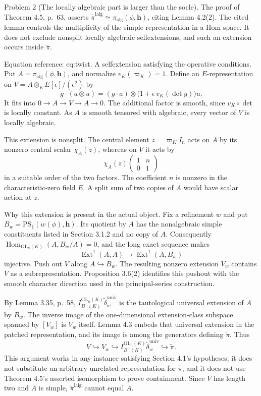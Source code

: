 \documentclass[10pt]{article}
\begin{document}
Problem 2 (The locally algebraic part is larger than the socle).  The proof of Theorem 4.5, p. 63, asserts \(\widetilde\pi^{\mathrm{lalg}}\simeq\pi_{\mathrm{alg}}(\phi,\mathbf h)\), citing Lemma 4.2(2). The cited lemma controls the multiplicity of the simple representation in a Hom space. It does not exclude nonsplit locally algebraic selfextensions, and such an extension occurs inside \(\widetilde\pi\).\par
Equation reference: eq:twist. A selfextension satisfying the operative conditions. Put \(A=\pi_{\mathrm{alg}}(\phi,\mathbf h)\), and normalize \(v_K(\varpi_K)=1\). Define an \(E\)-representation on \(V=A\otimes_E E[\epsilon]/(\epsilon^2)\) by \[
 g\cdot(a\otimes u)
   =(g\cdot a)\otimes
     \bigl(1+\epsilon\,v_K(\det g)\bigr)u .\] It fits into \(0\to A\to V\to A\to0\). The additional factor is smooth, since \(v_K\circ\det\) is locally constant. As \(A\) is smooth tensored with algebraic, every vector of \(V\) is locally algebraic.\par
This extension is nonsplit. The central element \(z=\varpi_K I_n\) acts on \(A\) by its nonzero central scalar \(\chi_A(z)\), whereas on \(V\) it acts by \[\chi_A(z)
 \begin{pmatrix}1&n\\0&1\end{pmatrix}\] in a suitable order of the two factors. The coefficient \(n\) is nonzero in the characteristic-zero field \(E\). A split sum of two copies of \(A\) would have scalar action at \(z\).\par
Why this extension is present in the actual object. Fix a refinement \(w\) and put \(B_w=\mathrm{PS}_1(w(\phi),\mathbf h)\). Its quotient by \(A\) has the nonalgebraic simple constituents listed in Section 3.1.2 and no copy of \(A\). Consequently \(\operatorname{Hom}_{\mathrm{GL}_n(K)}(A,B_w/A)=0\), and the long exact sequence makes \[\operatorname{Ext}^1(A,A)\longrightarrow\operatorname{Ext}^1(A,B_w)\] injective. Push out \(V\) along \(A\hookrightarrow B_w\). The resulting nonzero extension \(V_w\) contains \(V\) as a subrepresentation. Proposition 3.6(2) identifies this pushout with the smooth character direction used in the principal-series construction.\par
By Lemma 3.35, p. 58, \(I_{B^-(K)}^{\mathrm{GL}_n(K)}\widetilde\delta_w^{\mathrm{univ}}\) is the tautological universal extension of \(A\) by \(B_w\). The inverse image of the one-dimensional extension-class subspace spanned by \([V_w]\) is \(V_w\) itself. Lemma 4.3 embeds that universal extension in the patched representation, and its image is among the generators defining \(\widetilde\pi\). Thus \[V\hookrightarrow V_w\hookrightarrow
 I_{B^-(K)}^{\mathrm{GL}_n(K)}\widetilde\delta_w^{\mathrm{univ}}
 \hookrightarrow\widetilde\pi .\] This argument works in any instance satisfying Section 4.1’s hypotheses; it does not substitute an arbitrary unrelated representation for \(\widetilde\pi\), and it does not use Theorem 4.5’s asserted isomorphism to prove containment. Since \(V\) has length two and \(A\) is simple, \(\widetilde\pi^{\mathrm{lalg}}\) cannot equal \(A\).\par
\end{document}
